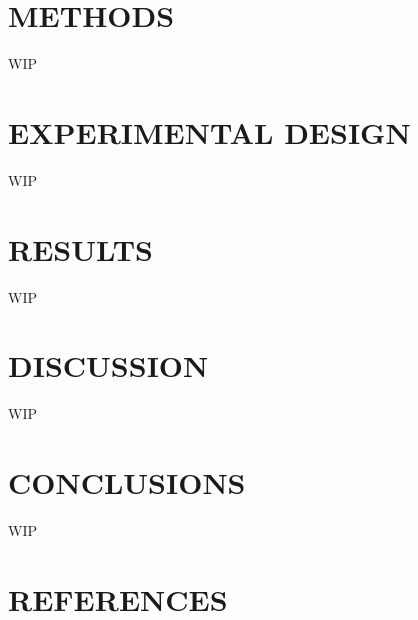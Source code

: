 \documentclass[conference]{IEEEtran}
\begin{document}


\section{METHODS}\label{methods}

WIP

\section{EXPERIMENTAL DESIGN}\label{experiments}

WIP

\section{RESULTS}\label{results}

WIP

\section{DISCUSSION}\label{discussion}

WIP

\section{CONCLUSIONS}\label{conclusions}

WIP

\section{REFERENCES}\label{references}
\end{document}
